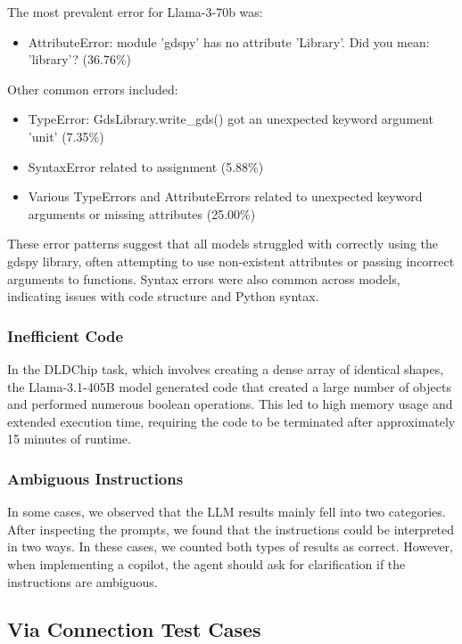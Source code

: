 \documentclass{article}
\begin{document}
The most prevalent error for Llama-3-70b was:
\begin{itemize}
    \item AttributeError: module 'gdspy' has no attribute 'Library'. Did you mean: 'library'? (36.76\%)
\end{itemize}

Other common errors included:
\begin{itemize}
    \item TypeError: GdsLibrary.write\_gds() got an unexpected keyword argument 'unit' (7.35\%)
    \item SyntaxError related to assignment (5.88\%)
    \item Various TypeErrors and AttributeErrors related to unexpected keyword arguments or missing attributes (25.00\%)
\end{itemize}

These error patterns suggest that all models struggled with correctly using the gdspy library, often attempting to use non-existent attributes or passing incorrect arguments to functions. Syntax errors were also common across models, indicating issues with code structure and Python syntax.

\subsubsection{Inefficient Code}
\label{appendix:inefficient_code}

In the DLDChip task, which involves creating a dense array of identical shapes, the Llama-3.1-405B model generated code that created a large number of objects and performed numerous boolean operations. This led to high memory usage and extended execution time, requiring the code to be terminated after approximately 15 minutes of runtime.

\subsubsection{Ambiguous Instructions}
\label{appendix:ambiguous_instructions}

In some cases, we observed that the LLM results mainly fell into two categories. After inspecting the prompts, we found that the instructions could be interpreted in two ways. In these cases, we counted both types of results as correct. However, when implementing a copilot, the agent should ask for clarification if the instructions are ambiguous.

\subsection{Via Connection Test Cases}
\label{appendix:via_connection}
\end{document}

